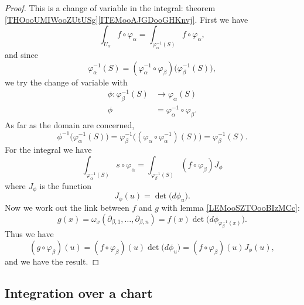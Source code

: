 \begin{proof}
	This is a change of variable in the integral: theorem \ref{THOooUMIWooZUtUSg}\ref{ITEMooAJGDooGHKnvj}. First we have
	\begin{equation}
		\int_{U_{\alpha}}f\circ \varphi_{\alpha}=\int_{\varphi_{\alpha}^{-1}(S)}f\circ \varphi_{\alpha},
	\end{equation}
	and since
	\begin{equation}
		\varphi_{\alpha}^{-1}(S)=(\varphi_{\alpha}^{-1}\circ\varphi_{\beta})\big( \varphi_{\beta}^{-1}(S) \big),
	\end{equation}
	we try the change of variable with
	\begin{equation}
		\begin{aligned}
			\phi\colon \varphi_{\beta}^{-1}(S) & \to \varphi_{\alpha}(S)                      \\
			\phi                               & =\varphi_{\alpha}^{-1}\circ \varphi_{\beta}.
		\end{aligned}
	\end{equation}
	As far as the domain are concerned,
	\begin{equation}
		\phi^{-1}\big( \varphi_{\alpha}^{-1}(S) \big)=\varphi_{\beta}^{-1}\big( (\varphi_{\alpha}\circ\varphi_{\alpha}^{-1})(S) \big)=\varphi_{\beta}^{-1}(S).
	\end{equation}
	For the integral we have
	\begin{equation}
		\int_{\varphi_{\alpha}^{-1}(S)}s\circ\varphi_{\alpha}=\int_{\varphi_{\beta}^{-1}(S)}(f\circ\varphi_{\beta})J_{\phi}
	\end{equation}
	where \( J_{\phi}\) is the function
	\begin{equation}
		J_{\phi}(u)=\det\big( d\phi_u \big).
	\end{equation}
	Now we work out the link between \( f\) and \( g\) with lemma \ref{LEMooSZTOooBIzMCc}:
	\begin{equation}
		g(x)=\omega_x(\partial_{\beta,1},\ldots,\partial_{\beta,n})=f(x)\det\big( d\phi_{\varphi_{\beta}^{-1}(x)} \big).
	\end{equation}
	Thus we have
	\begin{equation}
		(g\circ\varphi_{\beta})(u)=(f\circ\varphi_{\beta})(u)\det\big( d\phi_u \big)=(f\circ\varphi_{\beta})(u)J_{\phi}(u),
	\end{equation}
	and we have the result.
\end{proof}

\subsection{Integration over a chart}

